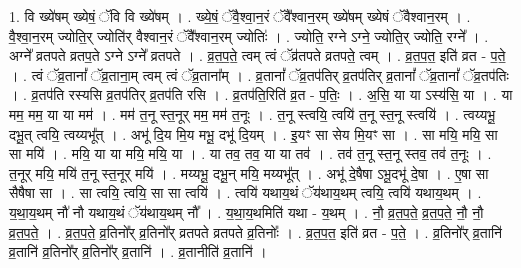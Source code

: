 \documentclass[17pt]{extarticle}
\begin{document}
1. वि ख्ये॑षम् ख्येषं॒ ॅवि वि ख्ये॑षम् । . ख्ये॒षं॒ ॅवै॒श्वा॒न॒रं ॅवै᳚श्वान॒रम् ख्ये॑षम् ख्येषं ॅवैश्वान॒रम् । . वै॒श्वा॒न॒रम् ज्योति॒र् ज्योति॑र् वैश्वान॒रं ॅवै᳚श्वान॒रम् ज्योतिः॑ । . ज्योति॒ रग्ने ऽग्ने॒ ज्योति॒र् ज्योति॒ रग्ने᳚ । . अग्ने᳚ व्रतपते व्रतप॒ते ऽग्ने ऽग्ने᳚ व्रतपते । . व्र॒त॒प॒ते॒ त्वम् त्वं ॅव्र॑तपते व्रतपते॒ त्वम् । . व्र॒त॒प॒त॒ इति॑ व्रत - प॒ते॒ । . त्वं ॅव्र॒तानां᳚ ॅव्र॒ताना॒म् त्वम् त्वं ॅव्र॒ताना᳚म् । . व्र॒तानां᳚ ॅव्र॒तप॑तिर् व्र॒तप॑तिर् व्र॒तानां᳚ ॅव्र॒तानां᳚ ॅव्र॒तप॑तिः । . व्र॒तप॑ति रस्यसि व्र॒तप॑तिर् व्र॒तप॑ति रसि । . व्र॒तप॑ति॒रिति॑ व्र॒त - प॒तिः॒ । . अ॒सि॒ या या ऽस्य॑सि॒ या । . या मम॒ मम॒ या या मम॑ । . मम॑ त॒नू स्त॒नूर् मम॒ मम॑ त॒नूः । . त॒नू स्त्वयि॒ त्वयि॑ त॒नू स्त॒नू स्त्वयि॑ । . त्वय्यभू॒ दभू॒त् त्वयि॒ त्वय्यभू᳚त् । . अभू॑ दि॒य मि॒य मभू॒ दभू॑ दि॒यम् । . इ॒यꣳ सा सेय मि॒यꣳ सा । . सा मयि॒ मयि॒ सा सा मयि॑ । . मयि॒ या या मयि॒ मयि॒ या । . या तव॒ तव॒ या या तव॑ । . तव॑ त॒नू स्त॒नू स्तव॒ तव॑ त॒नूः । . त॒नूर् मयि॒ मयि॑ त॒नू स्त॒नूर् मयि॑ । . मय्यभू॒ दभू॒न् मयि॒ मय्यभू᳚त् । . अभू॑ दे॒षैषा ऽभू॒दभू॑ दे॒षा । . ए॒षा सा सैषैषा सा । . सा त्वयि॒ त्वयि॒ सा सा त्वयि॑ । . त्वयि॑ यथाय॒थं ॅय॑थाय॒थम् त्वयि॒ त्वयि॑ यथाय॒थम् । . य॒था॒य॒थम् नौ॑ नौ यथाय॒थं ॅय॑थाय॒थम् नौ᳚ । . य॒था॒य॒थमिति॑ यथा - य॒थम् । . नौ॒ व्र॒त॒प॒ते॒ व्र॒त॒प॒ते॒ नौ॒ नौ॒ व्र॒त॒प॒ते॒ । . व्र॒त॒प॒ते॒ व्र॒तिनो᳚र् व्र॒तिनो᳚र् व्रतपते व्रतपते व्र॒तिनोः᳚ । . व्र॒त॒प॒त॒ इति॑ व्रत - प॒ते॒ । . व्र॒तिनो᳚र् व्र॒तानि॑ व्र॒तानि॑ व्र॒तिनो᳚र् व्र॒तिनो᳚र् व्र॒तानि॑ । . व्र॒तानीति॑ व्र॒तानि॑ । \newline
\end{document}
